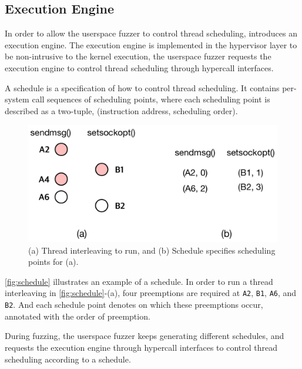 

\subsection{Execution Engine}
\label{ss:engine}

In order to allow the userspace fuzzer to control thread scheduling,
\sys introduces an execution engine.
%
The execution engine is implemented in the hypervisor layer to be
non-intrusive to the kernel execution, the userspace fuzzer requests
the execution engine to control thread scheduling through hypercall
interfaces.

%
A schedule is a specification of how to control thread scheduling.
%
It contains per-system call sequences of scheduling points, where each
scheduling point is described as a two-tuple, (instruction address,
scheduling order).

\begin{figure}[t]
  \centering
  \includegraphics[width=0.9\linewidth]{fig/schedule.pdf}
  \caption{(a) Thread interleaving to run, and (b) Schedule specifies
    scheduling points for (a).}
  \label{fig:schedule}
\end{figure}

\autoref{fig:schedule} illustrates an example of a schedule. In order
to run a thread interleaving in \autoref{fig:schedule}-(a), four
preemptions are required at \texttt{A2}, \texttt{B1}, \texttt{A6}, and
\texttt{B2}.
%
And each schedule point denotes on which these preemptions occur,
annotated with the order of preemption.


During fuzzing, the userspace fuzzer keeps generating different
schedules, and requests the execution engine through hypercall
interfaces to control thread scheduling according to a schedule.





